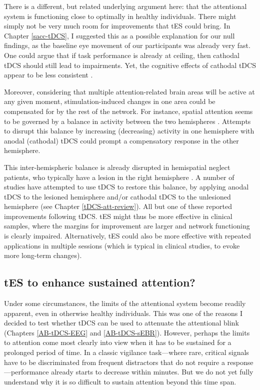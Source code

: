 \documentclass[11pt,english,]{memoir}
\begin{document}
There is a different, but related underlying argument here: that the attentional system is functioning close to optimally in healthy individuals. There might simply not be very much room for improvements that tES could bring. In Chapter \ref{sacc-tDCS}, I suggested this as a possible explanation for our null findings, as the baseline eye movement of our participants was already very fast. One could argue that if task performance is already at ceiling, then cathodal tDCS should still lead to impairments. Yet, the cognitive effects of cathodal tDCS appear to be less consistent \autocite{Jacobson2012}.

Moreover, considering that multiple attention-related brain areas will be active at any given moment, stimulation-induced changes in one area could be compensated for by the rest of the network. For instance, spatial attention seems to be governed by a balance in activity between the two hemispheres \autocite{Kinsbourne1970}. Attempts to disrupt this balance by increasing (decreasing) activity in one hemisphere with anodal (cathodal) tDCS could prompt a compensatory response in the other hemisphere.

This inter-hemispheric balance is already disrupted in hemispatial neglect patients, who typically have a lesion in the right hemisphere \autocite{Vallar1986}. A number of studies have attempted to use tDCS to restore this balance, by applying anodal tDCS to the lesioned hemisphere and/or cathodal tDCS to the unlesioned hemisphere (see Chapter \ref{tDCS-att-review}). All but one of these reported improvements following tDCS. tES might thus be more effective in clinical samples, where the margins for improvement are larger and network functioning is clearly impaired. Alternatively, tES could also be more effective with repeated applications in multiple sessions (which is typical in clinical studies, to evoke more long-term changes).

\hypertarget{tes-to-enhance-sustained-attention}{%
\subsection{tES to enhance sustained attention?}\label{tes-to-enhance-sustained-attention}}

Under some circumstances, the limits of the attentional system become readily apparent, even in otherwise healthy individuals. This was one of the reasons I decided to test whether tDCS can be used to attenuate the attentional blink (Chapters \ref{AB-tDCS-EEG} and \ref{AB-tDCS-sEBR}). However, perhaps the limits to attention come most clearly into view when it has to be sustained for a prolonged period of time. In a classic vigilance task---where rare, critical signals have to be discriminated from frequent distractors that do not require a response---performance already starts to decrease within minutes. But we do not yet fully understand why it is so difficult to sustain attention beyond this time span.
\end{document}
